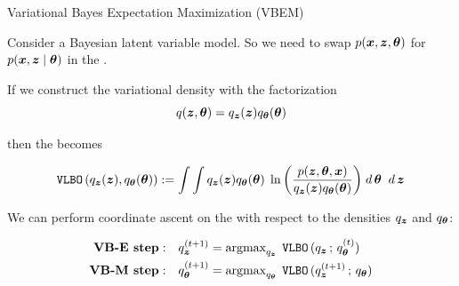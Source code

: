 \documentclass[10pt]{beamer}
\begin{document}


	\begin{frame}{Variational Bayes Expectation Maximization (VBEM)}
	
	Consider a \alert{Bayesian latent variable model}. %
	So we need to swap $p(\+x,\+z, \+\theta)$ for $p(\+x,\+z \cond \+\theta)$ in the \VLBO.
	
	
	If we construct the variational density with the factorization  
	\[  q(\+z,\+\theta)=q_\+z(\+z) q_{\+\theta}(\+\theta)\]
	
	
	then the \VLBO becomes
	
	\begin{equation}
	\VLBO (q_\+z(\+z), q_\+\theta(\+\theta)):=  \ds\int \ds\int  q_\+z(\+z) q_\+\theta(\+\theta) \; \ln \bigg( \df{p(\+z, \+\theta, \+x)}{q_\+z(\+z) q_\+\theta(\+\theta)} \bigg) \wrt{\+\theta} \wrt{\+z}  \label{VLBO_bayesian_latent}
	\end{equation}
	
	 
	We can perform coordinate ascent on the \VLBO with respect to the densities $q_\+z$ and $q_{\+\theta}$: 
	
	\begin{align*}
	\textbf{VB-E step}: \quad & q_{\+z}^{(t+1)} = \text{argmax}_{q_\+z} \; \VLBO (q_\+z \, ; \, q_{\+\theta}^{(t)} )  \\
	\textbf{VB-M step}: \quad & q_{\+\theta}^{(t+1)} = \text{argmax}_{q_{\+\theta}} \;  \VLBO (q_{\+z}^{(t+1)}  \, ; \, q_{\+\theta}) \\
	\end{align*} 
	
	\end{frame}
	
\end{document}
